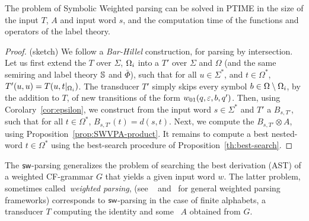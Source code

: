 %
\begin{proposition}
The problem of Symbolic Weighted  parsing 
can be solved in PTIME in the size of the input \SWT $T$, \SWVPA $A$
and input word $s$, 
and the computation time of the functions and operators of the label theory.
\end{proposition}
%
\begin{proof} (sketch)
We follow a \emph{Bar-Hillel} construction, for parsing by intersection.
%
\noindent
Let us first extend the \SWT $T$ over $\Sigma$, $\Omegai$ 
into a \SWT $T'$ over $\Sigma$ and $\Omega$ 
(and the same semiring and label theory $\mathbb{S}$ and $\bar\Phi$),
such that for all $u \in \Sigma^*$, and $t \in {\Omega}^*$, 
$T'(u, u) = T(u, t|_{\Omegai})$. 
%
The transducer $T'$ simply skips every symbol 
$b \in {\Omega} \setminus \Omegai$, 
by the addition to $T$,
of new transitions of the form $\wei_{01}(q, \varepsilon, b, q')$.
%
\noindent
Then, using Corolary~\ref{cor:epsilon}, 
we construct from the input word $s \in \Sigma^*$ and $T'$
a \SWA $B_{s, T'}$, 
such that for all $t \in \Omega^*$, $B_{s, T'}(t) = d(s, t)$.
%
%
\noindent
Next, %
we compute the \SWVPA $B_{s, T'} \otimes A$, 
using Proposition~\ref{prop:SWVPA-product}.
%
\noindent
It remains to compute a best nested-word $t \in {\Omega}^*$ 
using the best-search procedure of Proposition~\ref{th:best-search}.
\end{proof}
The $\textsf{sw}$-parsing generalizes 
the problem of searching the best derivation (AST) of a weighted CF-grammar $G$ 
that yields a given input word $w$.
The latter problem, sometimes called~\emph{weighted parsing},
(see \eg~\cite{Goodman99SemiringParsing} 
 and~\cite{MorbitzVogler19weighted-parsing} for general weighted parsing frameworks)
corresponds to $\textsf{sw}$-parsing in the case of finite alphabets,
a transducer $T$ computing the identity and some \SWVPA~$A$ 
obtained from $G$. %
%
